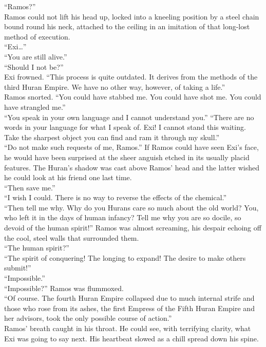 “Ramos?”\\
Ramos could not lift his head up, locked into a kneeling position by a steel chain bound round his neck, attached to the ceiling in an imitation of that long-lost method of execution.\\
“Exi…”\\
“You are still alive.”\\
“Should I not be?”\\
Exi frowned. “This process is quite outdated. It derives from the methods of the third Huran Empire. We have no other way, however, of taking a life.”\\
Ramos snorted. “You could have stabbed me. You could have shot me. You could have strangled me.”\\
“You speak in your own language and I cannot understand you.”
“There are no words in your language for what I speak of. Exi! I cannot stand this waiting. Take the sharpest object you can find and ram it through my skull.”\\
“Do not make such requests of me, Ramos.” If Ramos could have seen Exi’s face, he would have been surprised at the sheer anguish etched in its usually placid features. The Huran’s shadow was cast above Ramos’ head and the latter wished he could look at his friend one last time.\\
“Then save me.”\\
“I wish I could. There is no way to reverse the effects of the chemical.”\\
“Then tell me why. Why do you Hurans care so much about the old world? You, who left it in the days of human infancy? Tell me why you are so docile, so devoid of the human spirit!” Ramos was almost screaming, his despair echoing off the cool, steel walls that surrounded them.\\
“The human spirit?”\\
“The spirit of conquering! The longing to expand! The desire to make others submit!”\\
“Impossible.”\\
“Impossible?” Ramos was flummoxed.\\
“Of course. The fourth Huran Empire collapsed due to much internal strife and those who rose from its ashes, the first Empress of the Fifth Huran Empire and her advisors, took the only possible course of action.”\\
Ramos’ breath caught in his throat. He could see, with terrifying clarity, what Exi was going to say next. His heartbeat slowed as a chill spread down his spine.\\
